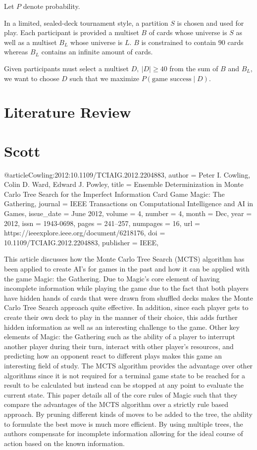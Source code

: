 \documentclass[12pt, letterpaper]{article}
\begin{document}
Let $ P $ denote probability.

In a limited, sealed-deck tournament style, a partition $ S $ is chosen and used for play.
Each participant is provided a multiset $ B $ of cards whose universe is $ S $
as well as a multiset $ B_L $ whose universe is $ L $.
$ B $ is constrained to contain $ 90 $ cards
whereas $ B_L $ contains an infinite amount of cards.

Given participants must select a multiset $ D, \ |D| \ge 40 $ from the sum of $ B $ and $ B_L $,
we want to choose $ D $ such that we maximize $ P(\text{game success} \mid D) $.

\section{Literature Review}

\section{Scott}

@article{Cowling:2012:10.1109/TCIAIG.2012.2204883,
author = {Peter I. Cowling, Colin D. Ward, Edward J. Powley},
title = {Ensemble Determinization in Monte Carlo Tree Search for the Imperfect Information Card Game Magic: The Gathering},
journal = {IEEE Transactions on Computational Intelligence and AI in Games},
issue_date = {June 2012},
volume = {4},
number = {4},
month = Dec,
year = {2012},
issn = {1943-0698},
pages = {241--257},
numpages = {16},
url = {https://ieeexplore.ieee.org/document/6218176},
doi = {10.1109/TCIAIG.2012.2204883},
publisher = {IEEE},
}

This article discusses how the Monte Carlo Tree Search (MCTS) algorithm has been applied to create AI’s for games in the
past and how it can be applied with the game Magic: the Gathering. Due to Magic’s core element of having incomplete
information while playing the game due to the fact that both players have hidden hands of cards that were drawn from
shuffled decks makes the Monte Carlo Tree Search approach quite effective. In addition, since each player gets to
create their own deck to play in the manner of their choice, this adds further hidden information as well as an
interesting challenge to the game. Other key elements of Magic: the Gathering such as the ability of a player to
interrupt another player during their turn, interact with other player’s resources, and predicting how an opponent
react to different plays makes this game an interesting field of study. The MCTS algorithm provides the advantage over
other algorithms since it is not required for a terminal game state to be reached for a result to be calculated but
instead can be stopped at any point to evaluate the current state. This paper details all of the core rules of Magic
such that they compare the advantages of the MCTS algorithm over a strictly rule based approach. By pruning different
kinds of moves to be added to the tree, the ability to formulate the best move is much more efficient. By using multiple
trees, the authors compensate for incomplete information allowing for the ideal course of action based on the known
information.
\end{document}
